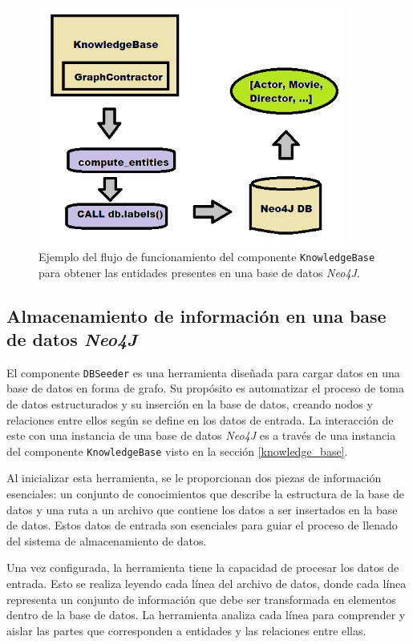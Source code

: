 \begin{figure}[H]\label{dbseeder}
	\centering
	\includegraphics[width = 0.9\textwidth]{./Graphics/knowledgebase}
	\caption{Ejemplo del flujo de funcionamiento del componente \texttt{KnowledgeBase} para obtener las entidades presentes en una base de datos \textit{Neo4J}.}
\end{figure}

\subsection{Almacenamiento de información en una base de datos \textit{Neo4J}} \label{dbseeding}

El componente \texttt{DBSeeder} es una herramienta diseñada para cargar datos en una base de datos en forma de grafo. Su propósito es automatizar el proceso de toma de datos estructurados y su inserción en la base de datos, creando nodos y relaciones entre ellos según se define en los datos de entrada. La interacción de este con una instancia de una base de datos \textit{Neo4J} es a través de una instancia del componente \texttt{KnowledgeBase} visto en la sección \ref{knowledge_base}.

Al inicializar esta herramienta, se le proporcionan dos piezas de información esenciales: un conjunto de conocimientos que describe la estructura de la base de datos y una ruta a un archivo que contiene los datos a ser insertados en la base de datos. Estos datos de entrada son esenciales para guiar el proceso de llenado del sistema de almacenamiento de datos.

Una vez configurada, la herramienta tiene la capacidad de procesar los datos de entrada. Esto se realiza leyendo cada línea del archivo de datos, donde cada línea representa un conjunto de información que debe ser transformada en elementos dentro de la base de datos. La herramienta analiza cada línea para comprender y aislar las partes que corresponden a entidades y las relaciones entre ellas.


